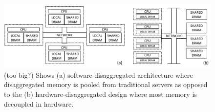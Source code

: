 \begin{figure}[h!]
\centering
\includegraphics[width=.9\linewidth]{fig/architecture.pdf}
\caption{(too big?) Shows (a) software-disaggregated architecture where disaggregated memory is pooled from 
traditional servers as opposed to the (b) hardware-disaggregated
design where most memory is decoupled in hardware.}
\label{fig:architecture}
\end{figure}